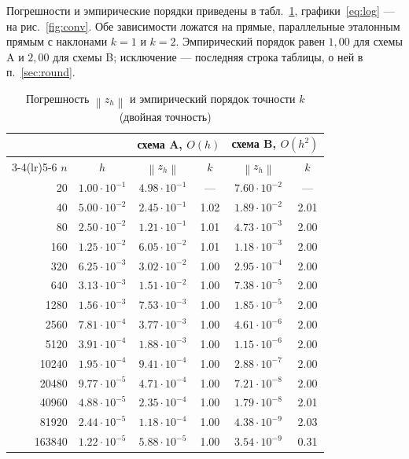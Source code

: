 \documentclass[12pt,a4paper]{article}
\newcommand{\norm}[1]{\left\|#1\right\|}
\begin{document}
Погрешности и эмпирические порядки приведены в табл.~\ref{tab:conv},
графики~\eqref{eq:log} --- на рис.~\ref{fig:conv}. Обе зависимости
ложатся на прямые, параллельные эталонным прямым с наклонами $k=1$ и
$k=2$. Эмпирический порядок равен $1{,}00$ для схемы A и $2{,}00$ для
схемы B; исключение --- последняя строка таблицы, о ней в
п.~\ref{sec:round}.

\begin{table}[htbp]
\caption{Погрешность $\norm{z_h}$ и эмпирический порядок точности $k$
(двойная точность)}
\label{tab:conv}
\centering
\begin{tabular}{r c c c c c}
\toprule
& & \multicolumn{2}{c}{схема A, $O(h)$} & \multicolumn{2}{c}{схема B, $O(h^2)$}\\
\cmidrule(lr){3-4}\cmidrule(lr){5-6}
$n$ & $h$ & $\norm{z_h}$ & $k$ & $\norm{z_h}$ & $k$\\
\midrule
20 & $1.00\cdot10^{-1}$ & $4.98\cdot10^{-1}$ & --- & $7.60\cdot10^{-2}$ & --- \\
40 & $5.00\cdot10^{-2}$ & $2.45\cdot10^{-1}$ & 1.02 & $1.89\cdot10^{-2}$ & 2.01 \\
80 & $2.50\cdot10^{-2}$ & $1.21\cdot10^{-1}$ & 1.01 & $4.73\cdot10^{-3}$ & 2.00 \\
160 & $1.25\cdot10^{-2}$ & $6.05\cdot10^{-2}$ & 1.01 & $1.18\cdot10^{-3}$ & 2.00 \\
320 & $6.25\cdot10^{-3}$ & $3.02\cdot10^{-2}$ & 1.00 & $2.95\cdot10^{-4}$ & 2.00 \\
640 & $3.13\cdot10^{-3}$ & $1.51\cdot10^{-2}$ & 1.00 & $7.38\cdot10^{-5}$ & 2.00 \\
1280 & $1.56\cdot10^{-3}$ & $7.53\cdot10^{-3}$ & 1.00 & $1.85\cdot10^{-5}$ & 2.00 \\
2560 & $7.81\cdot10^{-4}$ & $3.77\cdot10^{-3}$ & 1.00 & $4.61\cdot10^{-6}$ & 2.00 \\
5120 & $3.91\cdot10^{-4}$ & $1.88\cdot10^{-3}$ & 1.00 & $1.15\cdot10^{-6}$ & 2.00 \\
10240 & $1.95\cdot10^{-4}$ & $9.41\cdot10^{-4}$ & 1.00 & $2.88\cdot10^{-7}$ & 2.00 \\
20480 & $9.77\cdot10^{-5}$ & $4.71\cdot10^{-4}$ & 1.00 & $7.21\cdot10^{-8}$ & 2.00 \\
40960 & $4.88\cdot10^{-5}$ & $2.35\cdot10^{-4}$ & 1.00 & $1.79\cdot10^{-8}$ & 2.01 \\
81920 & $2.44\cdot10^{-5}$ & $1.18\cdot10^{-4}$ & 1.00 & $4.38\cdot10^{-9}$ & 2.03 \\
163840 & $1.22\cdot10^{-5}$ & $5.88\cdot10^{-5}$ & 1.00 & $3.54\cdot10^{-9}$ & 0.31 \\
\bottomrule
\end{tabular}
\end{table}
\end{document}
